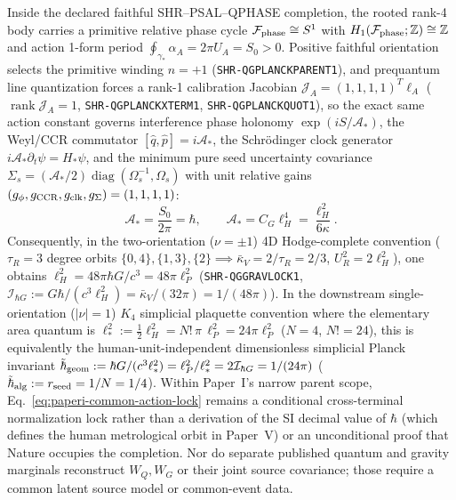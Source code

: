 \documentclass[11pt]{article}
\begin{document}
Inside the declared faithful SHR--PSAL--QPHASE completion, the rooted rank-4
body carries a primitive relative phase cycle $\mathcal F_{\rm phase}\cong S^1$
with $H_1(\mathcal F_{\rm phase};\mathbb Z)\cong\mathbb Z$ and action 1-form
period $\oint_{\gamma_*}\alpha_A = 2\pi U_A = S_0 > 0$.  Positive faithful
orientation selects the primitive winding $n=+1$ (\texttt{SHR-QGPLANCKPARENT1}),
and prequantum line quantization forces a rank-1 calibration Jacobian
$\mathcal J_A=(1,1,1,1)^T\ell_A$ ($\operatorname{rank}\mathcal J_A=1$,
\texttt{SHR-QGPLANCKXTERM1}, \texttt{SHR-QGPLANCKQUOT1}), so the exact same
action constant governs interference phase holonomy $\exp(iS/\mathcal A_*)$,
the Weyl/CCR commutator $[\hat q,\hat p]=i\mathcal A_*$, the Schr\"odinger
clock generator $i\mathcal A_*\partial_t\psi=H_*\psi$, and the minimum pure seed
uncertainty covariance $\Sigma_s=(\mathcal A_*/2)\operatorname{diag}(\Omega_s^{-1},\Omega_s)$
with unit relative gains $(g_\phi,g_{\rm CCR},g_{\rm clk},g_\Sigma)=(1,1,1,1)$:
\begin{equation}
 \mathcal A_*=\frac{S_0}{2\pi}=\hbar,
 \qquad
 \mathcal A_*=C_G\ell_H^4=\frac{\ell_H^2}{6\kappa}.
 \label{eq:paperi-common-action-lock}
\end{equation}
Consequently, in the two-orientation ($\nu=\pm 1$) 4D Hodge-complete convention
($\tau_R=3$ degree orbits $\{0,4\},\{1,3\},\{2\}\implies\bar\kappa_V=2/\tau_R=2/3$,
$U_R^2=2\ell_H^2$), one obtains $\ell_H^2=48\pi\hbar G/c^3=48\pi\ell_P^2$
(\texttt{SHR-QGGRAVLOCK1}, $\mathcal I_{\hbar G}:=G\hbar/(c^3\ell_H^2)=\bar\kappa_V/(32\pi)=1/(48\pi)$).
In the downstream single-orientation ($|\nu|=1$) $K_4$ simplicial plaquette
convention where the elementary area quantum is $\ell_*^2 := \frac{1}{2}\ell_H^2 = N!\,\pi\,\ell_P^2 = 24\pi\ell_P^2$
($N=4$, $N!=24$), this is equivalently the human-unit-independent dimensionless
simplicial Planck invariant $\tilde\hbar_{\rm geom}:=\hbar G/(c^3\ell_*^2)=\ell_P^2/\ell_*^2=2\mathcal I_{\hbar G}=1/(24\pi)$
($\tilde\hbar_{\rm alg}:=r_{\rm seed}=1/N=1/4$).
Within Paper~I's narrow parent scope, Eq.~\eqref{eq:paperi-common-action-lock}
remains a conditional cross-terminal normalization lock rather than a derivation
of the SI decimal value of $\hbar$ (which defines the human metrological orbit
in Paper~V) or an unconditional proof that Nature occupies the completion.  Nor do
separate published quantum and gravity marginals reconstruct $W_Q,W_G$ or
their joint source covariance; those require a common latent source model or
common-event data.
\end{document}
